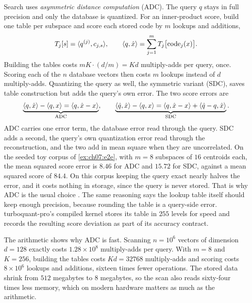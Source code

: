 Search uses \emph{asymmetric distance computation} (ADC). The query $q$ stays in full precision and only the database is quantized. For an inner-product score, build one table per subspace and score each stored code by $m$ lookups and additions,
\begin{equation}\label{eq:ch07:adc}
T_j[s]=\langle q^{(j)},c_{j,s}\rangle,\qquad
\langle q,\hat x\rangle=\sum_{j=1}^m T_j\big[\mathrm{code}_j(x)\big].
\end{equation}
Building the tables costs $mK\cdot(d/m)=Kd$ multiply-adds per query, once. Scoring each of the $n$ database vectors then costs $m$ lookups instead of $d$ multiply-adds. Quantizing the query as well, the symmetric variant (SDC), saves table construction but adds the query's own error. The two score errors are
\begin{equation}\label{eq:ch07:adcsdc}
\underbrace{\langle q,\hat x\rangle-\langle q,x\rangle=\langle q,\hat x-x\rangle}_{\text{ADC}},\qquad
\underbrace{\langle \hat q,\hat x\rangle-\langle q,x\rangle=\langle q,\hat x-x\rangle+\langle \hat q-q,\hat x\rangle}_{\text{SDC}} .
\end{equation}
ADC carries one error term, the database error read through the query. SDC adds a second, the query's own quantization error read through the reconstruction, and the two add in mean square when they are uncorrelated. On the seeded toy corpus of \cref{ex:ch07:e2e}, with $m=8$ subspaces of $16$ centroids each, the mean squared score error is $8.46$ for ADC and $15.72$ for SDC, against a mean squared score of $84.4$. On this corpus keeping the query exact nearly halves the error, and it costs nothing in storage, since the query is never stored. That is why ADC is the usual choice \cite{jegou2011pq}. The same reasoning says the lookup table itself should keep enough precision, because rounding the table is a query-side error. turboquant-pro's compiled kernel stores its table in $255$ levels for speed and records the resulting score deviation as part of its accuracy contract.

The arithmetic shows why ADC is fast. Scanning $n=10^6$ vectors of dimension $d=128$ exactly costs $1.28\times10^8$ multiply-adds per query. With $m=8$ and $K=256$, building the tables costs $Kd=32768$ multiply-adds and scoring costs $8\times10^6$ lookups and additions, sixteen times fewer operations. The stored data shrink from $512$ megabytes to $8$ megabytes, so the scan also reads sixty-four times less memory, which on modern hardware matters as much as the arithmetic.


